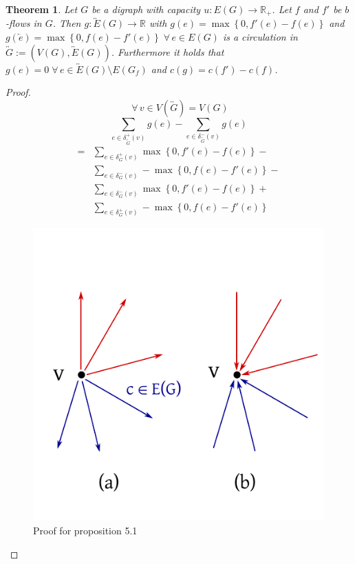 \documentclass{article}
\newtheorem{theorem}{Theorem}
\newcommand{\set}[1]{\left\{#1\right\}}
\newcommand{\fall}{\;\forall\,}
\begin{document}
\begin{theorem}\label{proposition-5.1}
  Let $G$ be a digraph with capacity $u: E(G) \rightarrow \mathbb{R}_+$. Let $f$ and $f'$ be $b$-flows in $G$. Then $g: \overleftrightarrow{E}(G) \rightarrow \mathbb{R}$ with $g(e) = \max\set{0,f'(e) - f(e)}$ and $g(\overleftarrow{e}) = \max\set{0, f(e) - f'(e)} \fall e \in E(G)$ is a \emph{circulation} in $\overleftrightarrow{G} := (V(G), \overleftrightarrow{E}(G))$. Furthermore it holds that $g(e) = 0 \fall e \in \overleftrightarrow E(G) \setminus E(G_f)$ and $c(g) = c(f') - c(f)$.
\end{theorem}

\begin{proof}
  \[ \fall v \in V(\overleftrightarrow{G}) = V(G) \]
  \begin{equation*}
    \sum_{e \in \delta^+_{\overleftrightarrow{G}}(v)} g(e) - \sum_{e \in \delta^-_{\overleftrightarrow{G}}(v)} g(e)
  \end{equation*} \begin{align*}
    = &\sum_{e \in \delta^+_{G}(v)} \max\set{0, f'(e) - f(e)} - \\
      &\sum_{e \in \delta^-_G(v)} -\max\set{0, f(e) - f'(e)} - \\
      &\sum_{e \in \delta^-_G(v)} \max\set{0, f'(e) - f(e)} + \\
      &\sum_{e \in \delta^+_G(v)} -\max\set{0, f(e) - f'(e)}
  \end{align*}

  \begin{figure}[ht]
   \begin{center}
    \includegraphics{img/proposition_5_1_proof.pdf}
    \caption{Proof for proposition 5.1}
   \end{center}
  \end{figure}


\end{proof}
\end{document}
